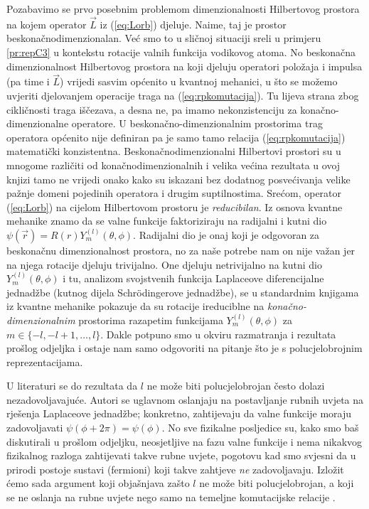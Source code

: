 Pozabavimo se prvo posebnim problemom dimenzionalnosti Hilbertovog prostora
na kojem operator $\vec{L}$ iz (\ref{eq:Lorb}) djeluje. Naime, taj
je prostor beskonačnodimenzionalan. Već smo to u sličnoj situaciji
sreli u primjeru \ref{pr:repC3} u kontekstu rotacije valnih funkcija
vodikovog atoma. No beskonačna dimenzionalnost Hilbertovog prostora
na koji djeluju operatori položaja i impulsa (pa time i $\vec{L}$)
vrijedi sasvim općenito u kvantnoj mehanici, u što se možemo uvjeriti
djelovanjem operacije traga na (\ref{eq:rpkomutacija}). Tu lijeva
strana zbog cikličnosti traga iščezava, a desna ne, pa imamo nekonzistenciju
za konačno-dimenzionalne operatore. U beskonačno-dimenzionalnim prostorima
trag operatora općenito nije definiran pa je samo tamo relacija
(\ref{eq:rpkomutacija}) matematički konzistentna.
Beskonačnodimenzionalni Hilbertovi prostori su u mnogome različiti
od konačnodimenzionalnih i velika većina rezultata u ovoj knjizi tamo ne vrijedi
onako kako su iskazani bez dodatnog posvećivanja velike pažnje
domeni pojedinih operatora i drugim suptilnostima.
Srećom, operator (\ref{eq:Lorb}) na cijelom Hilbertovom prostoru
je \emph{reducibilan}. Iz osnova kvantne mehanike znamo da se valne
funkcije faktoriziraju na radijalni i kutni dio $\psi(\vec{r})
= R(r) Y^{(l)}_{m}(\theta, \phi)$. Radijalni dio je onaj koji
je odgovoran za beskonačnu dimenzionalnost prostora,
no za naše potrebe nam on nije važan jer na njega rotacije djeluju
trivijalno. One djeluju netrivijalno na kutni dio $Y^{(l)}_{m}(\theta, \phi)$
i tu, analizom svojstvenih funkcija Laplaceove diferencijalne
jednadžbe (kutnog dijela Schr\"{o}dingerove jednadžbe), se u
standardnim knjigama iz kvantne mehanike pokazuje da su rotacije
ireduciblne na \emph{konačno-dimenzionalnim} prostorima razapetim
funkcijama $Y^{(l)}_{m}(\theta, \phi)$ za $m \in \{-l, -l+1, \ldots, l\}$.
Dakle potpuno smo u okviru razmatranja i rezultata prošlog odjeljka i ostaje
nam samo odgovoriti na pitanje što je s polucjelobrojnim reprezentacijama.

U literaturi se do rezultata da $l$ ne može biti polucjelobrojan
često dolazi nezadovoljavajuće. Autori se uglavnom oslanjaju na postavljanje rubnih
uvjeta na rješenja Laplaceove jednadžbe; konkretno, zahtijevaju
da valne funkcije moraju zadovoljavati $\psi(\phi + 2\pi) = \psi(\phi)$.
No sve fizikalne posljedice su, kako smo baš diskutirali
u prošlom odjeljku, neosjetljive na fazu valne funkcije
i nema nikakvog fizikalnog razloga zahtijevati takve rubne uvjete,
pogotovu kad smo svjesni da u prirodi postoje sustavi (fermioni)
koji takve zahtjeve \emph{ne} zadovoljavaju.
Izložit ćemo sada argument koji objašnjava zašto $l$ ne može biti
polucjelobrojan, a koji se ne oslanja na rubne uvjete nego samo
na temeljne komutacijske relacije \cite{Ballentine:1998}.

